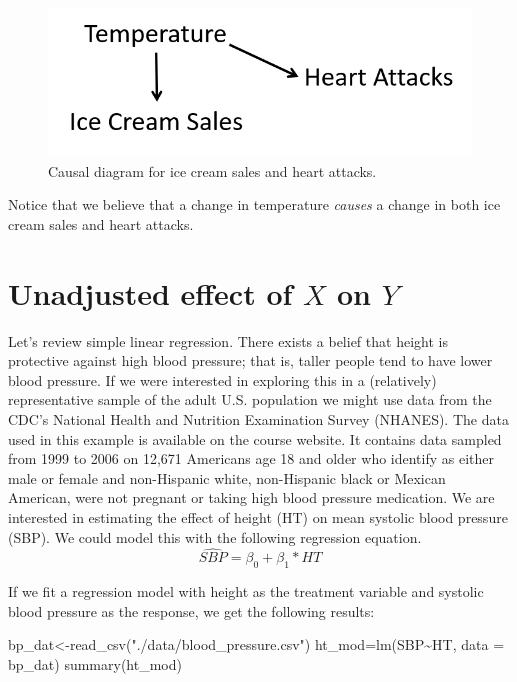 \documentclass[
]{book}
\newenvironment{Shaded}{\begin{snugshade}}{\end{snugshade}}
\newcommand{\AttributeTok}[1]{\textcolor[rgb]{0.77,0.63,0.00}{#1}}
\newcommand{\FunctionTok}[1]{\textcolor[rgb]{0.00,0.00,0.00}{#1}}
\newcommand{\NormalTok}[1]{#1}
\newcommand{\OtherTok}[1]{\textcolor[rgb]{0.56,0.35,0.01}{#1}}
\newcommand{\SpecialCharTok}[1]{\textcolor[rgb]{0.00,0.00,0.00}{#1}}
\newcommand{\StringTok}[1]{\textcolor[rgb]{0.31,0.60,0.02}{#1}}
\begin{document}
\begin{figure}
\centering
\includegraphics{./images/ice_cream_graph.png}
\caption{Causal diagram for ice cream sales and heart attacks.}
\end{figure}

Notice that we believe that a change in temperature \emph{causes} a change in both ice cream sales and heart attacks.

\hypertarget{unadjusted-effect-of-x-on-y}{%
\section{\texorpdfstring{Unadjusted effect of \(X\) on \(Y\)}{Unadjusted effect of X on Y}}\label{unadjusted-effect-of-x-on-y}}

Let's review simple linear regression. There exists a belief that height is protective against high blood pressure; that is, taller people tend to have lower blood pressure. If we were interested in exploring this in a (relatively) representative sample of the adult U.S. population we might use data from the CDC's National Health and Nutrition Examination Survey (NHANES). The data used in this example is available on the course website. It contains data sampled from 1999 to 2006 on 12,671 Americans age 18 and older who identify as either male or female and non-Hispanic white, non-Hispanic black or Mexican American, were not pregnant or taking high blood pressure medication. We are interested in estimating the effect of height (HT) on mean systolic blood pressure (SBP). We could model this with the following regression equation.
\[\widehat{SBP}=\beta_0+\beta_1*HT\]

If we fit a regression model with height as the treatment variable and systolic blood pressure as the response, we get the following results:

\begin{Shaded}
\begin{Highlighting}[]
\NormalTok{bp\_dat}\OtherTok{\textless{}{-}}\FunctionTok{read\_csv}\NormalTok{(}\StringTok{"./data/blood\_pressure.csv"}\NormalTok{)}
\NormalTok{ht\_mod}\OtherTok{=}\FunctionTok{lm}\NormalTok{(SBP}\SpecialCharTok{\textasciitilde{}}\NormalTok{HT,}
         \AttributeTok{data =}\NormalTok{ bp\_dat)}
\FunctionTok{summary}\NormalTok{(ht\_mod)}
\end{Highlighting}
\end{Shaded}
\end{document}
